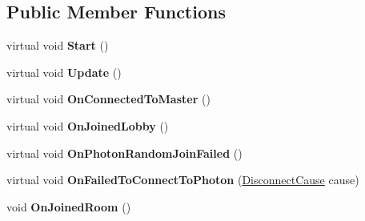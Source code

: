 \subsection*{Public Member Functions}
\begin{DoxyCompactItemize}
\item 
virtual void {\bfseries Start} ()\hypertarget{class_connect_and_join_random_a94e4c7f48112d0cdd76225301d58be0b}{}\label{class_connect_and_join_random_a94e4c7f48112d0cdd76225301d58be0b}

\item 
virtual void {\bfseries Update} ()\hypertarget{class_connect_and_join_random_ac667e7a1d80a18e1c03e39c74925a18f}{}\label{class_connect_and_join_random_ac667e7a1d80a18e1c03e39c74925a18f}

\item 
virtual void {\bfseries On\+Connected\+To\+Master} ()\hypertarget{class_connect_and_join_random_a2229303d2ad53f9ee29ee9cdd9a9f0be}{}\label{class_connect_and_join_random_a2229303d2ad53f9ee29ee9cdd9a9f0be}

\item 
virtual void {\bfseries On\+Joined\+Lobby} ()\hypertarget{class_connect_and_join_random_a41b158cb3ba3aad65798e8013fc5c56e}{}\label{class_connect_and_join_random_a41b158cb3ba3aad65798e8013fc5c56e}

\item 
virtual void {\bfseries On\+Photon\+Random\+Join\+Failed} ()\hypertarget{class_connect_and_join_random_ab9a5bda7e2e657e4f78bd550010ed851}{}\label{class_connect_and_join_random_ab9a5bda7e2e657e4f78bd550010ed851}

\item 
virtual void {\bfseries On\+Failed\+To\+Connect\+To\+Photon} (\hyperlink{group__public_api_gad61b1461cf60ad9e8d86923d111d5cc9}{Disconnect\+Cause} cause)\hypertarget{class_connect_and_join_random_aadf3359d7ba471cae2073f11b609d615}{}\label{class_connect_and_join_random_aadf3359d7ba471cae2073f11b609d615}

\item 
void {\bfseries On\+Joined\+Room} ()\hypertarget{class_connect_and_join_random_a4774e18af3d44ea1592a965cd0c5cca6}{}\label{class_connect_and_join_random_a4774e18af3d44ea1592a965cd0c5cca6}

\end{DoxyCompactItemize}
